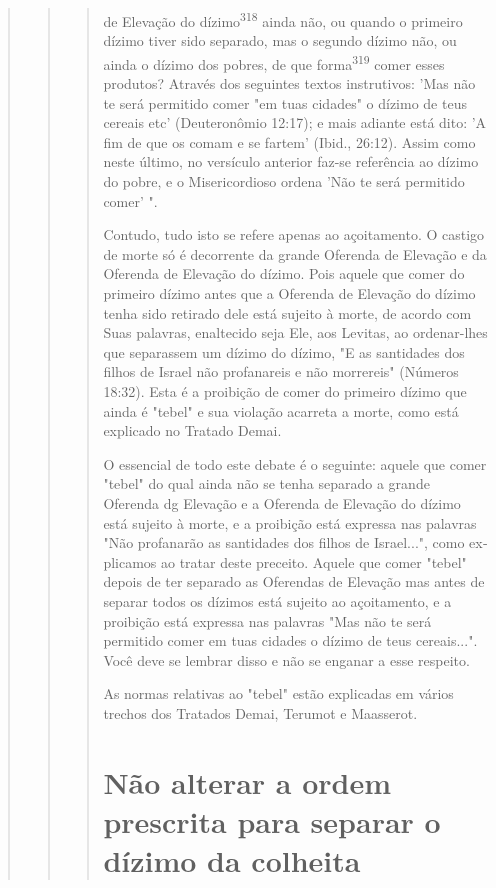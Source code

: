 \begin{quote}
\begin{quote}
\begin{quote}

de Elevação do dízimo\textsuperscript{318} ainda não, ou quando o
primeiro dízimo tiver sido separado, mas o segundo dízimo não, ou ainda
o dízimo dos pobres, de que forma\textsuperscript{319} comer esses
produtos? Através dos seguintes textos instrutivos: 'Mas não te será
permitido comer "em tuas cidades" o dízimo de teus cereais etc'
(Deuteronômio 12:17); e mais adiante está dito: 'A fim de que os comam e
se fartem' (Ibid., 26:12). Assim como neste último, no versículo
anterior faz-se re­ferência ao dízimo do pobre, e o Misericordioso
ordena 'Não te será permitido comer' ".

Contudo, tudo isto se refere apenas ao açoitamento. O castigo de morte
só é decorrente da grande Oferenda de Elevação e da Oferenda de
Ele­vação do dízimo. Pois aquele que comer do primeiro dízimo antes que
a Ofe­renda de Elevação do dízimo tenha sido retirado dele está sujeito
à morte, de acordo com Suas palavras, enaltecido seja Ele, aos Levitas,
ao ordenar-lhes que separassem um dízimo do dízimo, "E as santidades dos
filhos de Israel não pro­fanareis e não morrereis" (Números 18:32). Esta
é a proibição de comer do pri­meiro dízimo que ainda é "tebel" e sua
violação acarreta a morte, como está explicado no Tratado Demai.

O essencial de todo este debate é o seguinte: aquele que comer "te­bel"
do qual ainda não se tenha separado a grande Oferenda dg Elevação e a
Oferenda de Elevação do dízimo está sujeito à morte, e a proibição está
expres­sa nas palavras "Não profanarão as santidades dos filhos de
Israel...", como ex­plicamos ao tratar deste preceito. Aquele que comer
"tebel" depois de ter se­parado as Oferendas de Elevação mas antes de
separar todos os dízimos está sujeito ao açoitamento, e a proibição está
expressa nas palavras "Mas não te será permitido comer em tuas cidades o
dízimo de teus cereais...". Você deve se lembrar disso e não se enganar
a esse respeito.

As normas relativas ao "tebel" estão explicadas em vários trechos dos
Tratados Demai, Terumot e Maasserot.

\section{Não alterar a ordem prescrita para separar o dízimo da colheita}


\end{quote}
\end{quote}
\end{quote}
